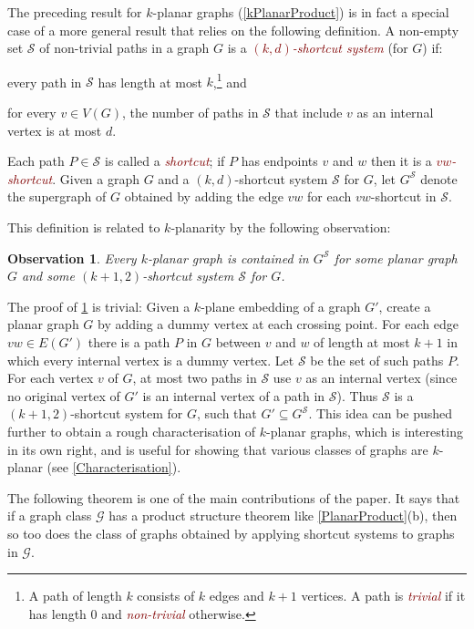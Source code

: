\documentclass{patmorin}
\theoremstyle{plain}
\newtheorem{obs}[thm]{Observation}
\theoremstyle{definition}
\newcommand{\defin}[1]{\textcolor{Maroon}{\emph{#1}}}
\renewcommand{\SS}{\mathcal{S}}
\begin{document}
The preceding result for $k$-planar graphs (\cref{kPlanarProduct}) is in fact a special case of a more general result that relies on the following definition. A non-empty set $\SS$ of non-trivial paths in a graph $G$ is a \defin{$(k,d)$-shortcut system} (for $G$) if:

\begin{compactitem}
\item every path in $\SS$ has length at most $k$,\footnote{A path of length $k$ consists of $k$ edges and $k+1$ vertices.  A path is \defin{trivial} if it has length 0 and \defin{non-trivial} otherwise.} and
\item for every $v\in V(G)$, the number of paths in $\SS$ that include $v$ as an internal vertex is at most $d$.
\end{compactitem}
Each path $P\in\SS$ is called a \defin{shortcut}; if $P$ has endpoints $v$ and $w$ then it is a \defin{$vw$-shortcut}. Given a graph $G$ and a $(k,d)$-shortcut system $\SS$ for $G$, let $G^{\SS}$ denote the supergraph of $G$ obtained by adding the edge $vw$ for each $vw$-shortcut in $\SS$.

This definition is related to $k$-planarity by the following observation:

\begin{obs}
\label{AddDummy}
Every $k$-planar graph is contained in $G^\SS$ for some planar graph $G$ and some $(k+1,2)$-shortcut system $\SS$ for $G$.
\end{obs}

The proof of \cref{AddDummy} is trivial: Given a $k$-plane embedding of a graph $G'$, create a planar graph $G$ by adding a dummy vertex at each crossing point. For each edge $vw\in E(G')$ there is a path $P$ in $G$ between $v$ and $w$ of length at most $k+1$ in which every internal vertex is a dummy vertex. Let $\SS$ be the set of such paths $P$. For each vertex $v$ of $G$, at most two paths in $\SS$ use $v$ as an internal vertex (since no original vertex of $G'$ is an internal vertex of a path in $\SS$). Thus $\SS$ is a $(k+1,2)$-shortcut system for $G$, such that $G'\subseteq G^\SS$. This idea can be pushed further to obtain a rough characterisation of $k$-planar graphs, which is interesting in its own right, and is useful for showing that various classes of graphs are $k$-planar (see \cref{Characterisation}).


The following theorem is one of the main contributions of the paper. It says that if a graph class $\mathcal{G}$ has a product structure theorem like \cref{PlanarProduct}(b), then so too does the class of graphs obtained by applying shortcut systems to graphs in $\mathcal{G}$.
\end{document}

